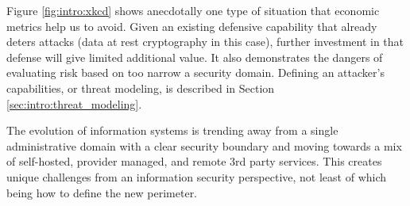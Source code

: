 Figure \ref{fig:intro:xkcd} shows anecdotally one type of situation that economic metrics help us to avoid. Given an existing defensive capability that already deters attacks (data at rest cryptography in this case), further investment in that defense will give limited additional value. It also demonstrates the dangers of evaluating risk based on too narrow a security domain. Defining an attacker's capabilities, or threat modeling, is described in Section  \ref{sec:intro:threat_modeling}.


The evolution of information systems is trending away from a single administrative domain with a clear security boundary and moving towards a mix of self-hosted, provider managed, and remote 3rd party services. This creates unique challenges from an information security perspective, not least of which being how to define the new perimeter. 




